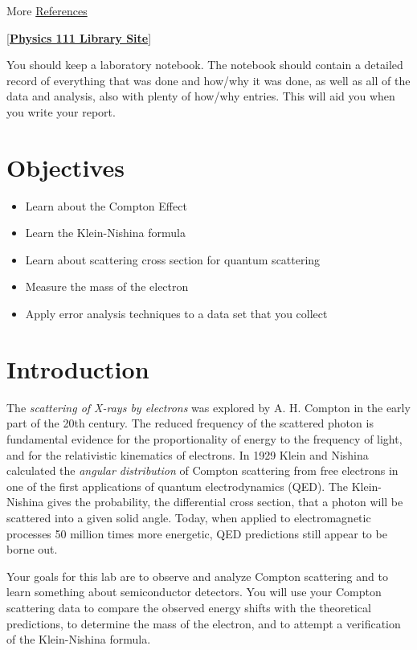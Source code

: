 \documentclass{../lab}
\begin{document}
More \hyperref[sec:References]{References}

[\href{\LabReprints}{\textbf{Physics 111 Library Site}}]

You should keep a laboratory notebook. The notebook should contain a detailed record of everything that was done and how/why it was done, as well as all of the data and analysis, also with plenty of how/why entries. This will aid you when you write your report.

\section{Objectives}

\begin{itemize}
    \item Learn about the Compton Effect

    \item Learn the Klein-Nishina formula

    \item Learn about scattering cross section for quantum scattering

    \item Measure the mass of the electron

    \item Apply error analysis techniques to a data set that you collect

\end{itemize}

\section{Introduction}

The \emph{scattering of X-rays by electrons }was explored by A. H. Compton in the early part of the 20th century. The reduced frequency of the scattered photon is fundamental evidence for the proportionality of energy to the frequency of light, and for the relativistic kinematics of electrons. In 1929 Klein and Nishina calculated the \emph{angular distribution} of Compton scattering from free electrons in one of the first applications of quantum electrodynamics (QED). The Klein-Nishina gives the probability, the differential cross section, that a photon will be scattered into a given solid angle. Today, when applied to electromagnetic processes 50 million times more energetic, QED predictions still appear to be borne out.

Your goals for this lab are to observe and analyze Compton scattering and to learn something about semiconductor detectors. You will use your Compton scattering data to compare the observed energy shifts with the theoretical predictions, to determine the mass of the electron, and to attempt a verification of the Klein-Nishina formula.
\end{document}

